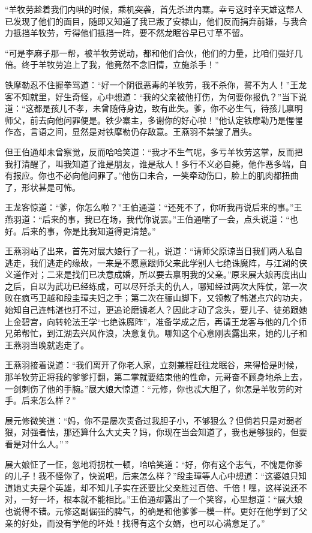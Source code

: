 \documentclass[12pt,oneside]{book}
\begin{document}
``羊牧劳趁着我们内哄的时候，乘机突袭，首先杀进内寨。幸亏这时辛天雄这帮人已发现了他们的面目，随即又知道了我已叛了安禄山，他们反而捐弃前嫌，与我合力抵挡羊牧劳，亏得他们抵挡一阵，要不然龙眠谷早已寸草不留。

``可是李麻子那一帮，被羊牧劳说动，都和他们合伙，他们的力量，比咱们强好几倍。终于羊牧劳追上了我，他竟然不念旧情，立施杀手！''

铁摩勒忍不住握拳骂道：``好一个阴很恶毒的羊牧劳，我不杀你，誓不为人！''王龙客不知就里，好生奇怪，心中想道：``我的父亲被他打伤，为何要你报仇？''当下说道：``这都是孩儿不孝，未曾随侍身边，致有此失。爹，你不必生气，待孩儿禀明师父，前去向他问罪便是。铁少寨主，多谢你的好心啦！''他认定铁摩勒乃是惺惺作态，言语之间，显然是对铁摩勒仍存敌意。王燕羽不禁皱了眉头。

但王伯通却未曾察觉，反而哈哈笑道：``我才不生气呢，多亏羊牧劳这掌，反而把我打清醒了，叫我知道了谁是朋友，谁是敌人！多行不义必自毙，他作恶多端，自有报应。你也不必向他问罪了。''他伤口未合，一笑牵动伤口，脸上的肌肉都扭曲了，形状甚是可怖。

王龙客惊道：``爹，你怎么啦？''王伯通道：``还死不了，你听我再说后来的事。''王燕羽道：``后来的事，我已在场，我代你说罢。''王伯通喘了一会，点头说道：``也好。后来的事，你是比我知道得更清楚。''

王燕羽站了出来，首先对展大娘行了一礼，说道：``请师父原谅当日我们两人私自逃走，我们逃走的缘故，一来是不愿意跟师父来此学别人七绝诛魔阵，与江湖的侠义道作对；二来是找们已决意成婚，所以要去禀明我的父亲。''原来展大娘再度出山之后，自以为武功已经练成，可以尽歼杀夫的仇人，哪知经过两次大阵仗，第一次败在疯丐卫越和段圭璋夫妇之手；第二次在骊山脚下，又领教了韩湛点穴的功夫，始知自己连韩湛也打不过，更追论磨镜老人？因此才动了念头，要儿子、徒弟跟她上金碧宫，向转轮法王学``七绝诛魔阵''，准备学成之后，再请王龙客与他的几个师兄弟帮忙，到江湖去兴风作浪，决意复仇。哪知这个心意刚表露出来，她的儿子和王燕羽当晚就逃走了。

王燕羽接着说道：``我们离开了你老人家，立刻兼程赶往龙眠谷，来得恰是时候，那羊牧劳正将我的爹爹打翻，第二掌就要结束他的性命，元哥奋不顾身地杀上去，一剑刺伤了他的手腕。''展大娘大惊道：``元修，你也忒大胆了，你怎是羊牧劳的对手。后来怎么样？''

展元修微笑道：``妈，你不是屡次责备过我胆子小，不够狠么？但倘若只是对弱者狠，对强者怯，那还算什么大丈夫？妈，你现在当会知道了，我也是够狠的，但要看是对什么人。''\,''

展大娘怔了一怔，忽地将拐杖一顿，哈哈笑道：``好，你有这个志气，不愧是你爹的儿子！我不怪你了，快说吧，后来怎么样？''段圭璋等人心中想道：``这婆娘只知道她丈夫是个英雄，却不知儿子实在还要比父亲胜过百倍、千倍！嘿，这样说还不对，一好一坏，根本就不能相比。''王伯通却露出了一个笑容，心里想道：``展大娘也说得不错。元修这副倔强的脾气，的确是和他爹爹一模一样。更好在他学到了父亲的好处，而没有学他的坏处！找得有这个女婿，也可以心满意足了。''
\end{document}
